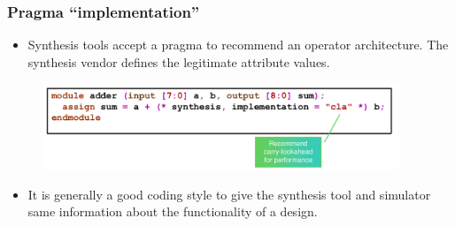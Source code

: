 \documentclass[t, notes, xcolor=table]{beamer}
\begin{document}
\begin{frame}
\frametitle{Pragma “implementation”}
\scriptsize{
\begin{itemize}
\item Synthesis tools accept a pragma to recommend an operator architecture. The synthesis vendor defines the legitimate attribute values.
\end{itemize}
\begin{figure}
    \includegraphics[width=0.95\textwidth]{img/13_pragma_implementation.png}
\end{figure}
\begin{itemize}
\item It is generally a good coding style to give the synthesis tool and simulator same information about the functionality of a design.
\end{itemize}
}
\end{frame}
\end{document}
